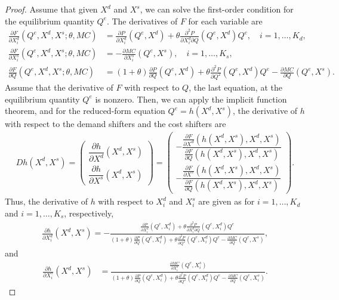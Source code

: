 \documentclass[11pt, a4paper]{article}
\theoremstyle{remark}
\begin{document}
\begin{proof}
Assume that given $X^{d}$ and $X^{s}$, we can solve the first-order condition for the equilibrium quantity $Q^e$.
The derivatives of $F$ for each variable are
\begin{align}
    \frac{\partial F}{\partial X^{d}_i}(Q^e, X^{d}, X^{s}; \theta, MC) & =  \frac{\partial P}{\partial X^{d}_{i}}(Q^e, X^{d}) + \theta\frac{\partial^2 P}{\partial X^{d}_{i}\partial Q}(Q^e, X^{d})Q^e, \quad i = 1, \ldots, K_d,\\
    \frac{\partial F}{\partial X^{s}_i}(Q^e, X^{d}, X^{s}; \theta, MC) & =  -\frac{\partial MC}{\partial X^{s}_{i}}(Q^e, X^{s}), \quad i = 1, \ldots, K_s, \\
    \frac{\partial F}{\partial Q}(Q^e, X^{d}, X^{s}; \theta, MC) & = (1+\theta)\frac{\partial P}{\partial Q}(Q^e, X^{d}) + \theta\frac{\partial^2 P}{\partial Q^2}(Q^e, X^{d})Q^e - \frac{\partial MC}{\partial Q}(Q^e, X^{s}).
\end{align}
Assume that the derivative of $F$ with respect to $Q$, the last equation, at the equilibrium quantity $Q^e$ is nonzero.
Then, we can apply the implicit function theorem, and for the reduced-form equation $Q^e = h(X^{d}, X^{s})$, the derivative of $h$ with respect to the demand shifters and the cost shifters are
\begin{align}
    Dh(X^{d}, X^{s}) = \begin{pmatrix}
        \dfrac{\partial h}{\partial X^{d}}(X^{d}, X^{s})\\[1em]
        \dfrac{\partial h}{\partial X^{s}}(X^{d}, X^{s})
    \end{pmatrix} = \begin{pmatrix}
        -\dfrac{\frac{\partial F}{\partial X^{d}}(h(X^{d}, X^{s}), X^{d}, X^{s})}{\frac{\partial F}{\partial Q}(h(X^{d}, X^{s}), X^{d}, X^{s})}\\[1.5em]
        -\dfrac{\frac{\partial F}{\partial X^{s}}(h(X^{d}, X^{s}), X^{d}, X^{s})}{\frac{\partial F}{\partial Q}(h(X^{d}, X^{s}), X^{d}, X^{s})}
    \end{pmatrix}.\label{eq:foc_derivative_demand_supply}
\end{align}
Thus, the derivative of $h$ with respect to $X^{d}_i$ and $X^{s}_i$ are given as for $i = 1, \ldots, K_d$ and $i = 1, \ldots, K_s$, respectively,
\begin{align}
    \frac{\partial h}{\partial X^{d}_{i}}(X^{d}, X^{s}) = -\frac{\frac{\partial P}{\partial X^{d}_{i}}(Q^e, X^{d}_i) + \theta\frac{\partial^2 P}{\partial X^{d}_{i}\partial Q}(Q^e, X^{d}_i)Q^e }{(1+\theta)\frac{\partial P}{\partial Q}(Q^e, X^{d}_i) + \theta\frac{\partial^2 P}{\partial Q^2}(Q^e, X^{d}_i)Q^e - \frac{\partial MC}{\partial Q}(Q^e, X^{s})}, \label{eq:foc_derivative_demand}
\end{align}
and
\begin{align}
    \frac{\partial h}{\partial X^{s}_{i}}(X^{d}, X^{s}) & = \frac{\frac{\partial MC}{\partial X^{s}_{i}}(Q^e, X^{s}_i)}{(1+\theta)\frac{\partial P}{\partial Q}(Q^e, X^{d}_i) + \theta\frac{\partial^2 P}{\partial Q^2}(Q^e, X^{d}_i)Q^e - \frac{\partial MC}{\partial Q}(Q^e, X^{s}_i)}. \label{eq:foc_derivative_supply}
\end{align}


\end{proof}
\end{document}
